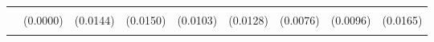 \begin{table}[!h]
\begin{tabular}[t]{lllllllll}
\addlinespace
\cellcolor{gray!10}{WSLS} & \cellcolor{gray!10}{0.0000} & \cellcolor{gray!10}{0.0237} & \cellcolor{gray!10}{0.0371*} & \cellcolor{gray!10}{0.0164} & \cellcolor{gray!10}{0.0224} & \cellcolor{gray!10}{0.0072} & \cellcolor{gray!10}{0.0092} & \cellcolor{gray!10}{0.0338*}\\
 & (0.0000) & (0.0144) & (0.0150) & (0.0103) & (0.0128) & (0.0076) & (0.0096) & (0.0165)\\
\cellcolor{gray!10}{T2} & \cellcolor{gray!10}{0.2255**} & \cellcolor{gray!10}{0.1719***} & \cellcolor{gray!10}{0.0238} & \cellcolor{gray!10}{0.0583*} & \cellcolor{gray!10}{0.0295} & \cellcolor{gray!10}{0.0566*} & \cellcolor{gray!10}{0.1497**} & \cellcolor{gray!10}{0.1798*}\\
\bottomrule
\end{tabular}
\end{table}